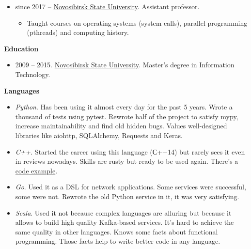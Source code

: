 \documentclass[final]{letter}
\begin{document}
\begin{itemize}
  \item since 2017 -- \href{http://fit.nsu.ru/}{Novosibirsk State University}. Assistant professor.
    \begin{itemize}
      \item Taught courses on operating systems (system calls), parallel programming (pthreads) and computing history.
    \end{itemize}
  \end{itemize}

{\bf Education}
\begin{itemize}
  \item 2009 -- 2015. \href{https://www.nsu.ru/n/}{Novosibirsk State University}. Master's degree in Information Technology.
\end{itemize}

{\bf Languages}
\begin{itemize}
\item \textit{Python}. Has been using it almost every day for the past 5 years.
  Wrote a thousand of tests using pytest. Rewrote half of the project to satisfy mypy, increase maintainability and find old hidden bugs.
  Values well-designed libraries like aiohttp, SQLAlchemy, Requests and Keras.
\item \textit{C++}. Started the career using this language (С++14) but rarely sees it even in reviews nowadays. Skills are rusty but ready to be used again.
  There's a \href{https://github.com/neexee/review}{code example}.
\item \textit{Go}. Used it as a DSL for network applications. Some services were successful, some were not.
   Rewrote the old Python service in it, it was very satisfying.
\item \textit{Scala}. Used it not because complex languages are alluring but because it allows to build high quality Kafka-based services. 
  It's hard to achieve the same quality in other languages.
  Knows some facts about functional programming. Those facts help to write better code in any language.
\end{itemize}
\end{document}
